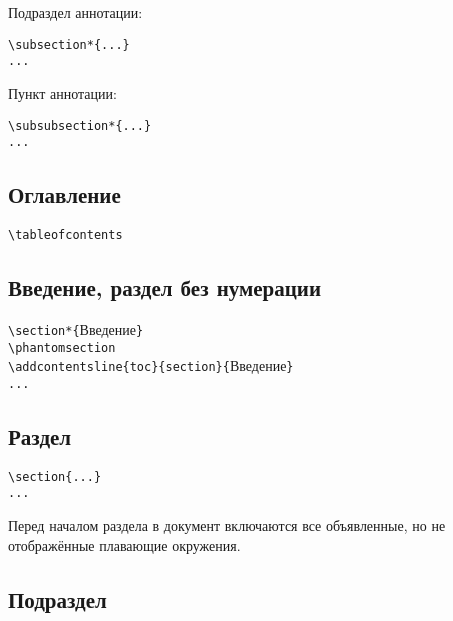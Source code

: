 \documentclass[14pt, a4paper, titlepage]{extarticle}
\renewcommand{\thesection}{\Asbuk{section}}
\let\oldsec\section
\renewcommand{\section}{
        \clearpage
        \phantomsection
        \refstepcounter{section}
        \setcounter{figure}{0} %
        \setcounter{table}{0} %
        \setcounter{equation}{0} %
        \addcontentsline{toc}{section}{\appendixname~\thesection}
        \oldsec*} %
\begin{document}
Подраздел аннотации:
\begin{verbatim}
\subsection*{...}
...
\end{verbatim}

Пункт аннотации:
\begin{verbatim}
\subsubsection*{...}
...
\end{verbatim}

\subsection{Оглавление}

\begin{verbatim}
\tableofcontents
\end{verbatim}

\subsection{Введение, раздел без нумерации}

\noindent\verb"\section*{"Введение\verb"}"\\
\verb"\phantomsection"\\
\verb"\addcontentsline{toc}{section}{"Введение\verb"}"\\
\verb"..."

\subsection{Раздел}

\begin{verbatim}
\section{...}
...
\end{verbatim}

Перед началом раздела в документ включаются все объявленные, но не отображённые плавающие окружения.

\subsection{Подраздел}
\end{document}
